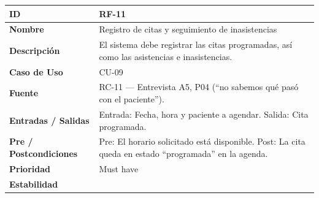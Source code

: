 \documentclass[
]{article}
\newcounter{none} %
\begin{document}
{\def\LTcaptype{none} %
\begin{longtable}[]{|
  >{\raggedright\arraybackslash}p{}|
  >{\raggedright\arraybackslash}p{}|}
\hline
\begin{minipage}[b]{\linewidth}\raggedright
\textbf{ID}
\end{minipage} & \begin{minipage}[b]{\linewidth}\raggedright
RF-11
\end{minipage} \\
\hline
\endhead
\hline
\endlastfoot
\textbf{Nombre} & \begin{minipage}[t]{\linewidth}\raggedright
Registro de citas y seguimiento de inasistencias
\end{minipage} \\
\hline
\textbf{Descripción} & \begin{minipage}[t]{\linewidth}\raggedright
El sistema debe registrar las citas programadas, así como las asistencias e inasistencias.
\end{minipage} \\
\hline
\textbf{Caso de Uso} & \begin{minipage}[t]{\linewidth}\raggedright
CU-09
\end{minipage} \\
\hline
\textbf{Fuente} & \begin{minipage}[t]{\linewidth}\raggedright
RC-11 — Entrevista A5, P04 (“no sabemos qué pasó con el paciente”).
\end{minipage} \\
\hline
\textbf{Entradas / Salidas} & \begin{minipage}[t]{\linewidth}\raggedright
Entrada: Fecha, hora y paciente a agendar. Salida: Cita programada.
\end{minipage} \\
\hline
\textbf{Pre / Postcondiciones} & \begin{minipage}[t]{\linewidth}\raggedright
Pre: El horario solicitado está disponible. Post: La cita queda en estado “programada” en la agenda.
\end{minipage} \\
\hline
\textbf{Prioridad} & \begin{minipage}[t]{\linewidth}\raggedright
Must have
\end{minipage} \\
\hline
\textbf{Estabilidad} & \begin{minipage}[t]{\linewidth}\raggedright

\end{minipage}
\end{longtable}}
\end{document}
